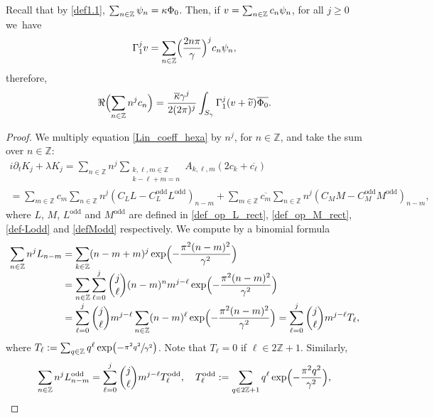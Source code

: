\documentclass[10pt]{amsart}
\theoremstyle{definition}
\let\EE\exp
\let\dis\relax
\let\ov\overline
\newcommand\Z{\mathbb Z}
\newcommand{\Bpa}[1]{\Bigl(#1\Bigr)}
\begin{document}
Recall that by \eqref{def1.1}, $\dis \sum_{n \in \Z} \psi_n= \kappa \Phi_0$. Then, if $ \dis v=\sum_{n \in \Z} c_n \psi_n $, for all $j \geq 0$ we~have\vspace*{-3pt}
\[
\Gamma^j_1 v=\sum_{n \in \Z} \Bigl(\frac{2 n \pi}\gamma\Bigr)^j c_n \psi_n, 
\]
therefore,\vspace*{-3pt}
\begin{equation*}
\Re\Bpa{\sum_{n\in\Z}n^jc_n} =\frac{\ov{\kappa} \gamma^j}{2(2\pi)^j} \int_{S_{\gamma}} \Gamma^j_1 (v+\widetilde{v}) \ov{\Phi_0}.
\end{equation*}

\begin{proof}
We multiply equation \eqref{Lin_coeff_hexa} by $n^j$, for $n\in\Z$, and take the sum over $n \in \Z$:\vspace*{-3pt}
\begin{multline} \label{sum_Kj}
i\partial_t K_j + \lambda K_j = \sum_{n \in \Z}n^j\sum_{\substack {k, \ell, m \in \Z\\ k-\ell+m=n}}A_{k,\ell,m}(2c_{k} + \ov{c_{\ell}}) \\[-3pt]
= \sum_{m\in\Z}c_m\sum_{n\in\Z} n^j {(C_LL-C_L^{\text{odd}}L^{\text{odd}})}_{n-m} + \sum_{m\in\Z}\ov{c_m}\sum_{n\in\Z} n^j {(C_MM-C_M^{\text{odd}}M^{\text{odd}})}_{n-m},
\end{multline}
where $L$, $M$, $L^{\text{odd}}$ and $M^{\text{odd}}$ are defined in \eqref{def_op_L_rect}, \eqref{def_op_M_rect}, \eqref{def-Lodd} and \eqref{defModd} respectively.
We compute by a binomial formula\vspace*{-3pt}
\begin{align*}
\sum_{n\in\Z} n^j L_{n-m} &=\sum_{k\in\Z} (n-m+m)^j \EE\Bigl({-\frac{\pi^2(n-m)^2}{\gamma^2}}\Bigr)\\[-5pt]
&= \sum_{n \in \Z}\sum_{\ell=0}^j \dbinom{j}{\ell}(n-m)^nm^{j-\ell}\EE\Bigl({-\frac{\pi^2(n-m)^2}{\gamma^2}}\Bigr) \\[-3pt]
&=\sum_{\ell=0}^j \dbinom{j}{\ell} m^{j-\ell} \sum_{n\in\Z}(n-m)^\ell\EE\Bigl({-\frac{\pi^2(n-m)^2}{\gamma^2}}\Bigr)= \sum_{\ell=0}^j \dbinom{j}{\ell} m^{j-\ell} T_\ell,
\end{align*}
where $T_\ell:= \sum_{q\in\Z}q^\ell\EE\bigl({-\sfrac{\pi^2q^2}{\gamma^2}}\bigr)$.
Note that $T_\ell = 0$ if $\ell \in 2\Z+1$. Similarly,\vspace*{-3pt}
\begin{equation*}
\sum_{n\in\Z} n^j L_{n-m}^{\text{odd}} = \sum_{\ell=0}^j \dbinom{j}{\ell} m^{j-\ell} T_\ell^{\text{odd}}, \quad T_\ell^{\text{odd}}:=\sum_{q\in2\Z+1}q^\ell\EE\Bigl({-\frac{\pi^2q^2}{\gamma^2}}\Bigr),

\end{equation*}
\end{proof}
\end{document}

